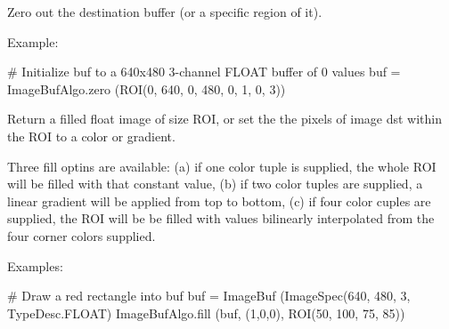 Zero out the destination buffer (or a specific region of it).

\smallskip
\noindent Example:
\begin{code}
    # Initialize buf to a 640x480 3-channel FLOAT buffer of 0 values
    buf = ImageBufAlgo.zero (ROI(0, 640, 0, 480, 0, 1, 0, 3))
\end{code}
\apiend

 

Return a filled float image of size ROI, or set the the pixels of image
{\cf dst} within the ROI to a color or gradient.

Three fill optins are available: (a) if one color tuple is supplied, the
whole ROI will be filled with that constant value, (b) if two color tuples
are supplied, a linear gradient will be applied from top to bottom, (c) if
four color cuples are supplied, the ROI will be be filled with values
bilinearly interpolated from the four corner colors supplied.

\smallskip
\noindent Examples:
\begin{code}
    # Draw a red rectangle into buf
    buf = ImageBuf (ImageSpec(640, 480, 3, TypeDesc.FLOAT)
    ImageBufAlgo.fill (buf, (1,0,0), ROI(50, 100, 75, 85))
\end{code}
\apiend


 

